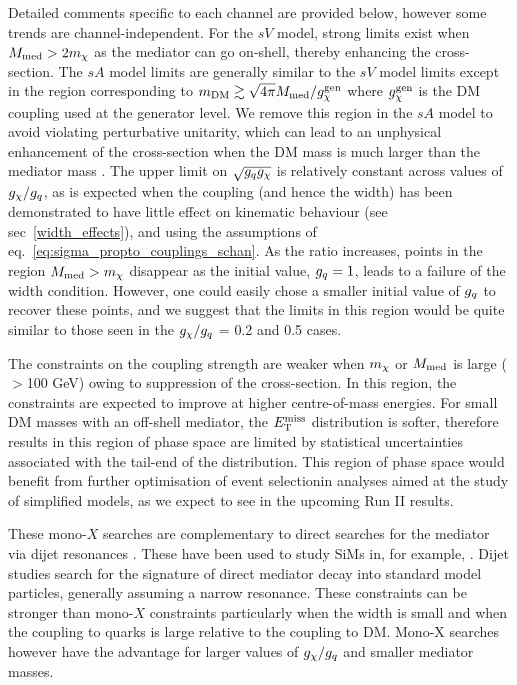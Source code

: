 Detailed comments specific to each channel are provided below, however some trends are channel-independent. For the $sV$ model, strong limits exist when $M_{\mathrm{med}} > 2 m_{\chi}$ as the mediator can go on-shell, thereby enhancing the cross-section. The $sA$ model limits are generally similar to the $sV$ model limits except in the region corresponding to $m_{\mathrm{DM}} \gtrsim \sqrt{4\pi} M_{\mathrm{med}} / g^{\rm gen}_\chi$ where $g^{\rm gen}_\chi$ is the DM coupling used at the generator level. We remove this region in the $sA$ model to avoid violating perturbative unitarity, which can lead to an unphysical enhancement of the cross-section when the DM mass is much larger than the mediator mass \cite{Bell:2015rdw}. The upper limit on $\sqrt{g_q g_{\chi}}$ is relatively constant across values of $g_{\chi} / g_q$, as is expected when the coupling (and hence the width) has been demonstrated to have little effect on kinematic behaviour (see sec~\ref{width_effects}), and using the assumptions of eq.~\ref{eq:sigma_propto_couplings_schan}. As the ratio increases, points in the region $M_{\mathrm{med}} > m_{\chi}$ disappear as the initial value, $g_q = 1$, leads to a failure of the width condition. However, one could easily chose a smaller initial value of $g_q$ to recover these points, and we suggest that the limits in this region would be quite similar to those seen in the $g_{\chi} / g_q$ = 0.2 and 0.5 cases.

The constraints on the coupling strength are weaker when $m_{\chi}$ or $M_{\mathrm{med}}$ is large ($>$100 GeV) owing to suppression of the cross-section. In this region, the constraints are expected to improve at higher centre-of-mass energies. For small DM masses with an off-shell mediator, the $E_{\mathrm{T}}^{\mathrm{miss}}$ distribution is softer, therefore results in this region of phase space are limited by statistical uncertainties associated with the tail-end of the distribution. This region of phase space would benefit from further optimisation of event selectionin analyses aimed at the study of simplified models, as we expect to see in the upcoming Run II results.

These mono-$X$ searches are complementary to direct searches for the mediator via dijet resonances \cite{Chatrchyan:2013qha, Aad:2014aqa, Aaltonen:2008dn, Khachatryan:2015sja}. These have been used to study SiMs in, for example, \cite{An:2012va, Zurek:tchannel}. Dijet studies search for the signature of direct mediator decay into standard model particles, generally assuming a narrow resonance. These constraints can be stronger than mono-$X$ constraints particularly when the width is small and when the coupling to quarks is large relative to the coupling to DM. Mono-X searches however have the advantage for larger values of $g_{\chi}/g_q$ and smaller mediator masses.

